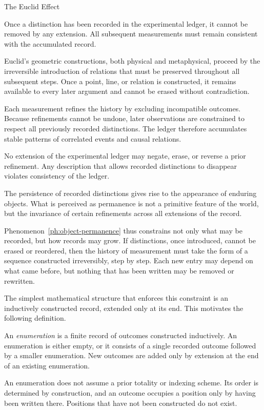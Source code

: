 \begin{phenom}{The Euclid Effect~\cite{euclid300bc}}
\label{ph:object-permanence}

\PhStatement
Once a distinction has been recorded in the experimental ledger, it cannot be
removed by any extension. All subsequent measurements must remain
consistent with the accumulated record.

\PhOrigin
Euclid’s geometric constructions, both physical and metaphysical, proceed by the 
irreversible introduction of
relations that must be preserved throughout all subsequent steps. Once a point,
line, or relation is constructed, it remains available to every later argument
and cannot be erased without contradiction.

\PhObservation
Each measurement refines the history by excluding incompatible
outcomes. Because refinements cannot be undone, later observations are
constrained to respect all previously recorded distinctions. The ledger
therefore accumulates stable patterns of correlated events and causal relations.

\PhConstraint
No extension of the experimental ledger may negate, erase, or reverse
a prior refinement. Any description that allows recorded distinctions to
disappear violates consistency of the ledger.

\PhConsequence
The persistence of recorded distinctions gives rise to the appearance of
enduring objects. What is perceived as permanence is not a primitive
feature of the world, but the invariance of certain refinements across all
extensions of the record.
\end{phenom}

Phenomenon~\ref{ph:object-permanence} thus constrains not only what may be 
recorded, but how records
may grow. If distinctions, once introduced, cannot be erased or reordered, then
the history of measurement must take the form of a sequence constructed
irreversibly, step by step. Each new entry may depend on what came before, but
nothing that has been written may be removed or rewritten.

The simplest mathematical structure that enforces this constraint is an
inductively constructed record, extended only at its end. This motivates the
following definition.

\begin{definition}[Enumeration]
An \emph{enumeration} is a finite record of outcomes constructed inductively.
An enumeration is either empty, or it consists of a single recorded outcome
followed by a smaller enumeration. New outcomes are added only by extension at
the end of an existing enumeration.

An enumeration does not assume a prior totality or indexing scheme. Its order
is determined by construction, and an outcome occupies a position only by
having been written there. Positions that have not been constructed do not
exist.
\end{definition}

